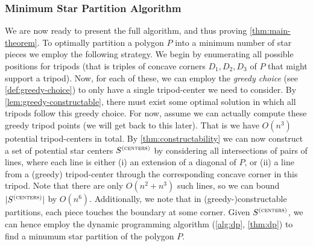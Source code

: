 \documentclass{theoretics}
\newcommand\Scen{S^{\textsc{(centers)}}}
\begin{document}
\subsubsection{Minimum Star Partition Algorithm}
We are now ready to present the full algorithm, and thus proving \cref{thm:main-theorem}.
To optimally partition a polygon $P$ into a minimum number of star pieces we employ the following strategy. We begin by enumerating all possible positions for tripods (that is triples of concave corners $D_1, D_2, D_3$ of $P$ that might support a tripod). Now, for each of these, we can employ the \emph{greedy choice} (see \cref{def:greedy-choice}) to only have a single tripod-center we need to consider. By \cref{lem:greedy-constructable}, there must exist some optimal solution in which all tripods follow this greedy choice. For now, assume we can actually compute these greedy tripod points (we will get back to this later). That is we have $O(n^3)$ potential tripod-centers in total. By \cref{thm:constructability} we can now construct a set of potential star centers $\Scen$ by considering all intersections of pairs of lines, where each line is either (i) an extension of a diagonal of $P$, or (ii) a line from a (greedy) tripod-center through the corresponding concave corner in this tripod. Note that there are only $O(n^2 + n^3)$ such lines, so we can bound $|\Scen|$ by $O(n^6)$.
Additionally, we note that in (greedy-)constructable partitions, each piece touches the boundary at some corner.
Given $\Scen$, we can hence employ the dynamic programming algorithm (\cref{alg:dp}, \cref{thm:dp}) to find a minumum star partition of the polygon $P$.
\end{document}

